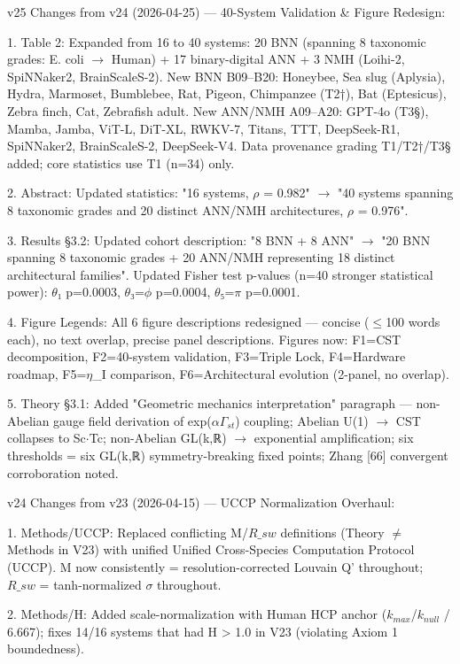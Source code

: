 \documentclass[a4paper,12pt]{article}
\begin{document}
v25 Changes from v24 (2026-04-25) --- 40-System Validation \& Figure Redesign:

1.
Table 2: Expanded from 16 to 40 systems: 20 BNN (spanning 8 taxonomic grades: E. coli $\rightarrow$ Human) + 17 binary-digital ANN + 3 NMH (Loihi-2, SpiNNaker2, BrainScaleS-2).
New BNN B09--B20: Honeybee, Sea slug (Aplysia), Hydra, Marmoset, Bumblebee, Rat, Pigeon, Chimpanzee (T2†), Bat (Eptesicus), Zebra finch, Cat, Zebrafish adult.
New ANN/NMH A09--A20: GPT-4o (T3§), Mamba, Jamba, ViT-L, DiT-XL, RWKV-7, Titans, TTT, DeepSeek-R1, SpiNNaker2, BrainScaleS-2, DeepSeek-V4.
Data provenance grading T1/T2†/T3§ added; core statistics use T1 (n=34) only.

2. Abstract: Updated statistics: "16 systems, $\rho$ = 0.982" $\rightarrow$ "40 systems spanning 8 taxonomic grades and 20 distinct ANN/NMH architectures, $\rho$ = 0.976".

3. Results §3.2: Updated cohort description: "8 BNN + 8 ANN" $\rightarrow$ "20 BNN spanning 8 taxonomic grades + 20 ANN/NMH representing 18 distinct architectural families". Updated Fisher test p-values (n=40 stronger statistical power): $\theta$₁ p=0.0003, $\theta$₃=$\phi$ p=0.0004, $\theta$₅=$\pi$ p=0.0001.

4. Figure Legends: All 6 figure descriptions redesigned --- concise ($\leq$100 words each), no text overlap, precise panel descriptions. Figures now: F1=CST decomposition, F2=40-system validation, F3=Triple Lock, F4=Hardware roadmap, F5=$\eta$_I comparison, F6=Architectural evolution (2-panel, no overlap).

5. Theory §3.1: Added "Geometric mechanics interpretation" paragraph --- non-Abelian gauge field derivation of exp($\alpha$\cdot$\Gamma_{st}$) coupling; Abelian U(1) $\rightarrow$ CST collapses to Sc$\cdot$Tc; non-Abelian GL(k,ℝ) $\rightarrow$ exponential amplification; six thresholds = six GL(k,ℝ) symmetry-breaking fixed points; Zhang [66] convergent corroboration noted.

v24 Changes from v23 (2026-04-15) --- UCCP Normalization Overhaul:

1. Methods/UCCP: Replaced conflicting M/$R\_{sw}$ definitions (Theory $\neq$ Methods in V23) with unified Unified Cross-Species Computation Protocol (UCCP). M now consistently = resolution-corrected Louvain Q' throughout; $R\_{sw}$ = tanh-normalized $\sigma$ throughout.

2. Methods/H: Added scale-normalization with Human HCP anchor ($k_{max}$/$k_{null}$ / 6.667); fixes 14/16 systems that had H > 1.0 in V23 (violating Axiom 1 boundedness).
\end{document}
